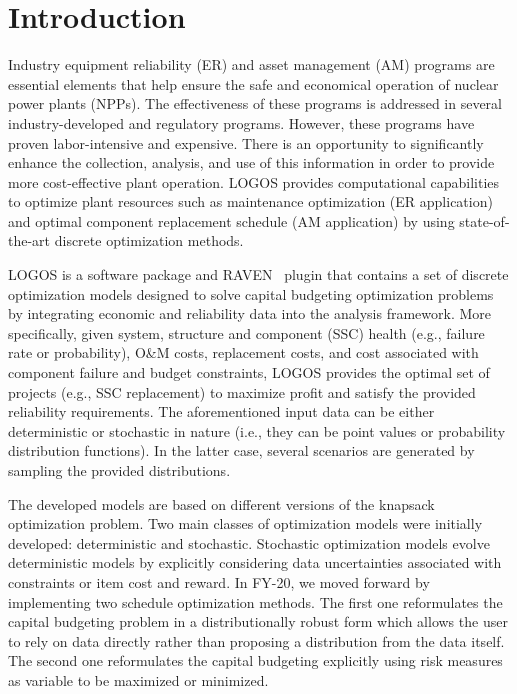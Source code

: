 \section{Introduction}
\label{sec:Introduction}

Industry equipment reliability (ER) and asset management (AM) programs are essential elements that
help ensure the safe and economical operation of nuclear power plants (NPPs).
The effectiveness of
these programs is addressed in several industry-developed and regulatory programs.
However, these programs have proven labor-intensive and expensive.
There is an opportunity to significantly
enhance the collection, analysis, and use of this information in order to provide more cost-effective plant
operation.
LOGOS provides computational capabilities to optimize plant resources such as
maintenance optimization (ER application) and optimal component replacement schedule (AM application)
by using state-of-the-art discrete optimization methods.

LOGOS is a software package and RAVEN~\cite{RAVEN,RAVENtheoryMan} plugin that
contains a set of discrete optimization models designed to solve capital budgeting optimization
problems by integrating economic and reliability data into the analysis framework.
More specifically, given system, structure and component
(SSC) health (e.g., failure rate or probability), O\&M costs, replacement costs, and cost
associated with component failure and budget constraints, LOGOS provides the optimal set of projects
(e.g., SSC replacement) to maximize profit and satisfy the provided reliability requirements.
The aforementioned input data can be either deterministic or stochastic in nature (i.e., they can be point values or probability distribution functions).
In the latter case, several scenarios are generated by
sampling the provided distributions.

The developed models are based on different versions of the knapsack optimization problem.
Two main classes of optimization models were initially developed: deterministic and stochastic.
Stochastic optimization models evolve deterministic models by explicitly considering data
uncertainties associated with constraints or item cost and reward. In FY-20, we moved forward
by implementing two schedule optimization methods. The first one reformulates the
capital budgeting problem in a distributionally robust form which allows the user to rely on
data directly rather than proposing a distribution from the data itself. The second one
reformulates the capital budgeting explicitly using risk measures as variable to be maximized or
minimized.

